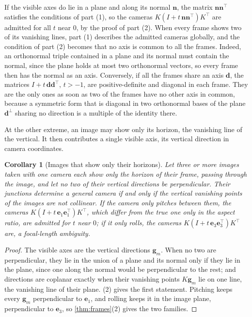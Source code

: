 \documentclass[pdflatex,sn-mathphys-num,iicol]{sn-jnl}
\newcommand{\vd}{\mathbf{d}}
\theoremstyle{thmstyleone}
\newtheorem{corollary}[theorem]{Corollary}
\theoremstyle{thmstylethree}
\theoremstyle{thmstyletwo}
\begin{document}
If the visible axes do lie in a plane and along its normal $\mathbf n$, the matrix $\mathbf n\mathbf n^{\top}$ satisfies the conditions of part (1), so the cameras $K(I+t\,\mathbf n\mathbf n^{\top})K^{\top}$ are admitted for all $t$ near $0$, by the proof of part (2). When every frame shows two of its vanishing lines, part (1) describes the admitted cameras globally, and the condition of part (2) becomes that no axis is common to all the frames. Indeed, an orthonormal triple contained in a plane and its normal must contain the normal, since the plane holds at most two orthonormal vectors, so every frame then has the normal as an axis. Conversely, if all the frames share an axis $\vd$, the matrices $I+t\,\vd\vd^{\top}$, $t>-1$, are positive-definite and diagonal in each frame. They are the only ones as soon as two of the frames have no other axis in common, because a symmetric form that is diagonal in two orthonormal bases of the plane $\vd^{\perp}$ sharing no direction is a multiple of the identity there.



At the other extreme, an image may show only its horizon, the vanishing line of the vertical. It then contributes a single visible axis, its vertical direction in camera coordinates.

\begin{corollary}[Images that show only their horizons]\label{cor:horizons}
Let three or more images taken with one camera each show only the horizon of their frame, passing through the image, and let no two of their vertical directions be perpendicular. Their junctions determine a general camera if and only if the vertical vanishing points of the images are not collinear. If the camera only pitches between them, the cameras $K(I+t\,\mathbf e_1\mathbf e_1^{\top})K^{\top}$, which differ from the true one only in the aspect ratio, are admitted for $t$ near $0$; if it only rolls, the cameras $K(I+t\,\mathbf e_3\mathbf e_3^{\top})K^{\top}$ are, a focal-length ambiguity.
\end{corollary}
\begin{proof}
The visible axes are the vertical directions $\mathbf g_m$. When no two are perpendicular, they lie in the union of a plane and its normal only if they lie in the plane, since one along the normal would be perpendicular to the rest; and directions are coplanar exactly when their vanishing points $K\mathbf g_m$ lie on one line, the vanishing line of their plane. (2) gives the first statement. Pitching keeps every $\mathbf g_m$ perpendicular to $\mathbf e_1$, and rolling keeps it in the image plane, perpendicular to $\mathbf e_3$, so \cref{thm:frames}(2) gives the two families.
\end{proof}
\end{document}
